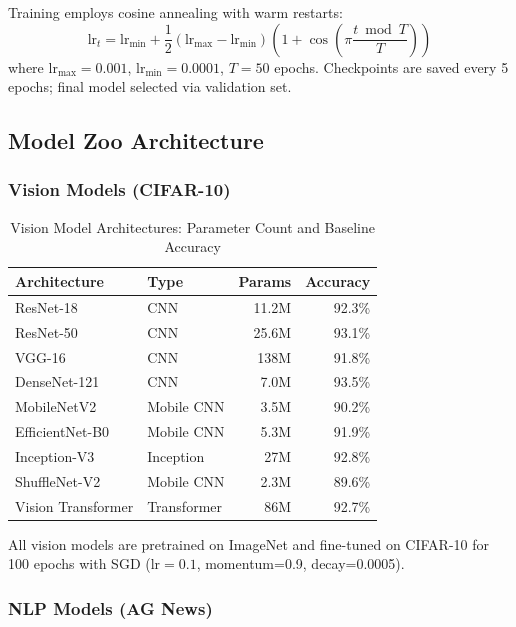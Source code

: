 \documentclass[10pt,conference]{IEEEtran}
\begin{document}
Training employs cosine annealing with warm restarts:
\begin{equation}
\text{lr}_t = \text{lr}_{\text{min}} + \frac{1}{2} \left( \text{lr}_{\text{max}} - \text{lr}_{\text{min}} \right) \left( 1 + \cos\left(\pi \frac{t \bmod T}{T}\right) \right)
\end{equation}
where $\text{lr}_{\text{max}}=0.001$, $\text{lr}_{\text{min}}=0.0001$, $T=50$ epochs. Checkpoints are saved every 5 epochs; final model selected via validation set.

\subsection{Model Zoo Architecture}

\subsubsection{Vision Models (CIFAR-10)}

\begin{table}[t]
\centering
\caption{Vision Model Architectures: Parameter Count and Baseline Accuracy}
\begin{tabular}{llrr}
\toprule
\textbf{Architecture} & \textbf{Type} & \textbf{Params} & \textbf{Accuracy} \\
\midrule
ResNet-18 & CNN & 11.2M & 92.3\% \\
ResNet-50 & CNN & 25.6M & 93.1\% \\
VGG-16 & CNN & 138M & 91.8\% \\
DenseNet-121 & CNN & 7.0M & 93.5\% \\
MobileNetV2 & Mobile CNN & 3.5M & 90.2\% \\
EfficientNet-B0 & Mobile CNN & 5.3M & 91.9\% \\
Inception-V3 & Inception & 27M & 92.8\% \\
ShuffleNet-V2 & Mobile CNN & 2.3M & 89.6\% \\
Vision Transformer & Transformer & 86M & 92.7\% \\
\bottomrule
\end{tabular}
\end{table}

All vision models are pretrained on ImageNet and fine-tuned on CIFAR-10 for 100 epochs with SGD ($\text{lr}=0.1$, momentum=0.9, decay=0.0005).

\subsubsection{NLP Models (AG News)}
\end{document}
